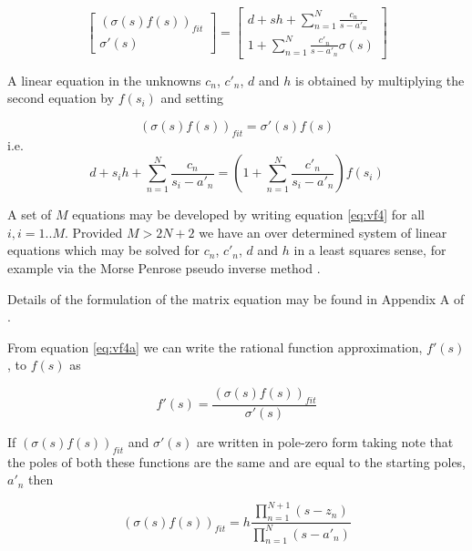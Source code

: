 \begin{equation}\label{eq:vf3}
\left[\begin{array}{c} (\sigma(s)f(s))_{fit} \\[10pt] \sigma'(s) \end{array}\right]
=
\left[\begin{array}{c}
d+sh+\sum_{n=1}^N \frac{c_n}{s-a'_n} 
\\[10pt] 
1+\sum_{n=1}^N \frac{c'_n}{s-a'_n} 
\sigma(s) \end{array}\right]
\end{equation} 

A linear equation in the unknowns $c_n$, $c'_n$, $d$ and $h$ is obtained by  multiplying the second equation by $f(s_i)$ and setting

\begin{equation}\label{eq:vf4a}
(\sigma(s)f(s))_{fit}=\sigma'(s)f(s)
\end{equation} 
i.e.
\begin{equation}\label{eq:vf4}
d+s_i h+\sum_{n=1}^N \frac{c_n}{s_i-a'_n} = \left( 1+\sum_{n=1}^N \frac{c'_n}{s_i-a'_n} \right) f(s_i)
\end{equation} 

A set of $M$ equations may be developed by writing equation \ref{eq:vf4} for all $i, i=1..M$. Provided $M > 2N+2$ we have an over determined system of linear equations which may be solved for $c_n$, $c'_n$, $d$ and $h$ in a least squares sense, for example via the Morse Penrose pseudo inverse method \cite{numerical_recipes}.

Details of the formulation of the matrix equation may be found in Appendix A of \cite{vfit1}.

From equation \ref{eq:vf4a} we can write the rational function approximation, $f'(s)$, to $f(s)$ as

\begin{equation}\label{eq:vf5}
f'(s)=\frac{(\sigma(s)f(s))_{fit}}{\sigma'(s)}
\end{equation} 

If $(\sigma(s)f(s))_{fit}$ and $\sigma'(s)$ are written in pole-zero form taking note that the poles of both these functions are the same and are equal to the starting poles, $a'_n$ then

\begin{equation}\label{eq:vf6}
(\sigma(s)f(s))_{fit}=h \frac{\prod_{n=1}^{N+1} \left( s-z_n\right)}{\prod_{n=1}^N \left( s-a'_n\right)}
\end{equation} 

